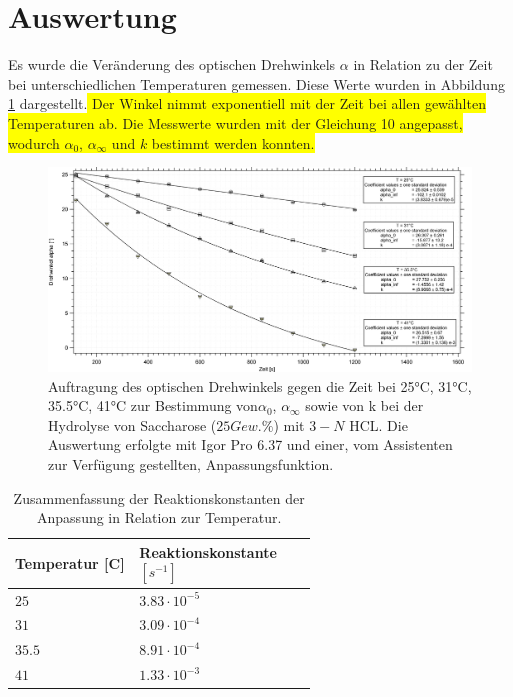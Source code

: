 %
%

\section{Auswertung}

Es wurde die Veränderung des optischen Drehwinkels $\alpha$ in Relation zu der Zeit bei unterschiedlichen Temperaturen gemessen. Diese Werte wurden in Abbildung \ref{at} dargestellt.\colorbox{yellow}{ Der Winkel nimmt exponentiell mit der Zeit bei allen gewählten Temperaturen ab. Die Messwerte wurden mit der Gleichung 10 angepasst, wodurch $\alpha_0$, $\alpha_\infty$ und $k$ bestimmt werden konnten.}


\begin{figure}[h]
	\centering	
	\begin{minipage}{1\textwidth}
	\includegraphics[width=\columnwidth]{Bilder/Graph1.png}
	\end{minipage}
		\caption{Auftragung des optischen Drehwinkels gegen die Zeit bei 25°C, 31°C, 35.5°C, 41°C zur Bestimmung von$\alpha_0$, $\alpha_\infty$ sowie von k bei der Hydrolyse von Saccharose ($25 Gew.\%$) mit $3-N$ HCL. Die Auswertung erfolgte mit Igor Pro 6.37 und einer, vom Assistenten zur Verfügung gestellten, Anpassungsfunktion.}
	\label{at}
\end{figure}

\begin{table}[H]
\centering

 
 
 \caption{Zusammenfassung der Reaktionskonstanten der Anpassung  in Relation zur Temperatur.}
\begin{tabular}{L{0.3\linewidth}L{0.3\linewidth}}
Temperatur [\text{\textdegree}C] & Reaktionskonstante $[\si{s}^{-1}]$ \\
\hline \addlinespace[1ex] 
$25$ & $3.83\cdot 10^{-5}$ \\
$31$ & $3.09\cdot 10^{-4}$ \\
$35.5$ & $8.91\cdot 10^{-4}$ \\
$41$ & $1.33\cdot 10^{-3}$ \\
 \end{tabular}
 \label{tab1}
 \end{table}

